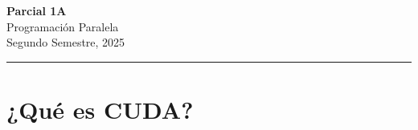 



\begin{center}
    \LARGE\textbf{Parcial 1A} \\
    \Large{Programación Paralela} \\
    \normalsize{Segundo Semestre, 2025} \\
    \vspace{1em}
    \hrule
\end{center}

\vspace{1em}

\section{¿Qué es CUDA?}


